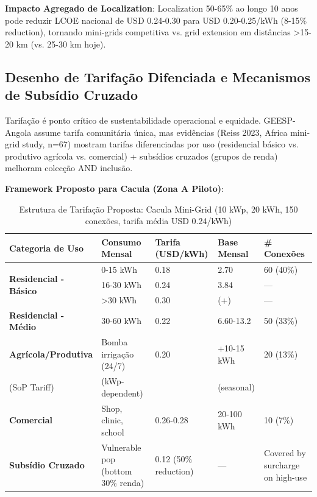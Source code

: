 \documentclass[12pt, a4paper]{article}
\begin{document}
\textbf{Impacto Agregado de Localization}: Localization 50-65\% ao longo 10 anos pode reduzir LCOE nacional de USD 0.24-0.30 para USD 0.20-0.25/kWh (8-15\% reduction), tornando mini-grids competitiva vs. grid extension em distâncias >15-20 km (vs. 25-30 km hoje).

\subsection{Desenho de Tarifação Difenciada e Mecanismos de Subsídio Cruzado}

Tarifação é ponto crítico de sustentabilidade operacional e equidade. GEESP-Angola assume tarifa comunitária única, mas evidências (Reiss 2023, Africa mini-grid study, n=67) mostram tarifas diferenciadas por uso (residencial básico vs. produtivo agrícola vs. comercial) + subsídios cruzados (grupos de renda) melhoram colecção AND inclusão.

\textbf{Framework Proposto para Cacula (Zona A Piloto)}: 

\begin{table}[H]
\centering
\caption{Estrutura de Tarifação Proposta: Cacula Mini-Grid (10 kWp, 20 kWh, 150 conexões, tarifa média USD 0.24/kWh)}
\label{tab:tariff_structure}
\small
\begin{tabular}{|l|l|l|l|l|}
\hline
\textbf{Categoria de Uso} & \textbf{Consumo Mensal} & \textbf{Tarifa (USD/kWh)} & \textbf{Base Mensal} & \textbf{\# Conexões} \\
\hline
\multirow{3}{*}{\textbf{Residencial - Básico}} & 0-15 kWh & 0.18 & 2.70 & 60 (40\%) \\
& 16-30 kWh & 0.24 & 3.84 & — \\
& >30 kWh & 0.30 & (+) & — \\
\hline
\textbf{Residencial - Médio} & 30-60 kWh & 0.22 & 6.60-13.2 & 50 (33\%) \\
\hline
\textbf{Agrícola/Produtiva} & Bomba irrigação (24/7) & 0.20 & +10-15 kWh & 20 (13\%) \\
(SoP Tariff) & (kWp-dependent) & & (seasonal) & \\
\hline
\textbf{Comercial} & Shop, clinic, school & 0.26-0.28 & 20-100 kWh & 10 (7\%) \\
\hline
\textbf{Subsídio Cruzado} & Vulnerable pop (bottom 30\% renda) & 0.12 (50\% reduction) & — & Covered by surcharge on high-use \\
\hline
\end{tabular}
\end{table}
\end{document}
